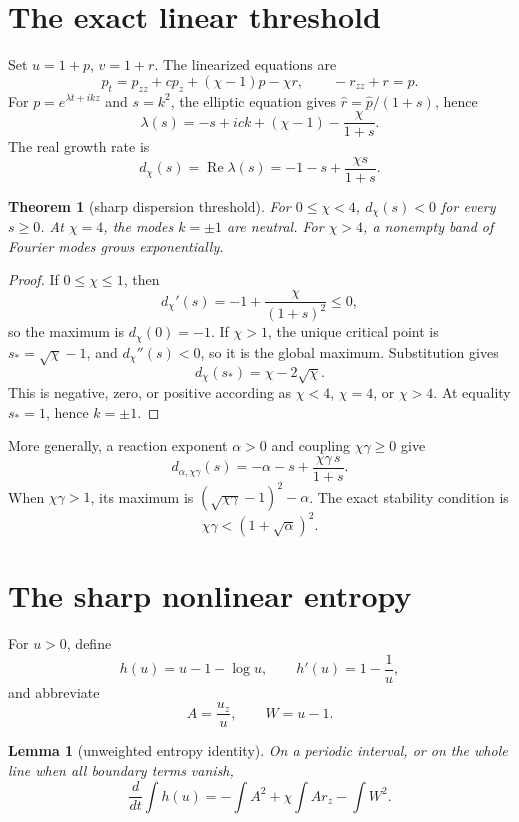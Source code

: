 \documentclass[11pt]{article}
\newtheorem{theorem}{Theorem}
\newtheorem{lemma}{Lemma}
\begin{document}
\section{The exact linear threshold}

Set \(u=1+p\), \(v=1+r\).  The linearized equations are
\[
 p_t=p_{zz}+cp_z+(\chi-1)p-\chi r,
 \qquad -r_{zz}+r=p.
\]
For \(p=e^{\lambda t+ikz}\) and \(s=k^2\), the elliptic equation gives
\(\widehat r=\widehat p/(1+s)\), hence
\begin{equation}
 \lambda(s)=-s+ick+(\chi-1)-\frac{\chi}{1+s}.           \label{eq:lambda}
\end{equation}
The real growth rate is
\begin{equation}
 d_\chi(s)=\operatorname{Re}\lambda(s)
 =-1-s+\frac{\chi s}{1+s}.                             \label{eq:disp}
\end{equation}

\begin{theorem}[sharp dispersion threshold]
For \(0\le\chi<4\), \(d_\chi(s)<0\) for every \(s\ge0\).  At \(\chi=4\),
the modes \(k=\pm1\) are neutral.  For \(\chi>4\), a nonempty band of
Fourier modes grows exponentially.
\end{theorem}

\begin{proof}
If \(0\le\chi\le1\), then
\[
 d_\chi'(s)=-1+\frac{\chi}{(1+s)^2}\le0,
\]
so the maximum is \(d_\chi(0)=-1\).  If \(\chi>1\), the unique critical
point is \(s_*=\sqrt\chi-1\), and \(d_\chi''(s)<0\), so it is the global
maximum.  Substitution gives
\[
 d_\chi(s_*)=\chi-2\sqrt\chi.
\]
This is negative, zero, or positive according as \(\chi<4\), \(\chi=4\),
or \(\chi>4\).  At equality \(s_*=1\), hence \(k=\pm1\).
\end{proof}

More generally, a reaction exponent \(\alpha>0\) and coupling
\(\chi\gamma\ge0\) give
\[
 d_{\alpha,\chi\gamma}(s)
 =-\alpha-s+\frac{\chi\gamma\,s}{1+s}.
\]
When \(\chi\gamma>1\), its maximum is
\((\sqrt{\chi\gamma}-1)^2-\alpha\).  The exact stability condition is
\[
 \chi\gamma<(1+\sqrt\alpha)^2.
\]

\section{The sharp nonlinear entropy}

For \(u>0\), define
\[
 h(u)=u-1-\log u,\qquad h'(u)=1-\frac1u,
\]
and abbreviate
\[
 A=\frac{u_z}{u},\qquad W=u-1.
\]

\begin{lemma}[unweighted entropy identity]
On a periodic interval, or on the whole line when all boundary terms vanish,
\begin{equation}
 \frac{d}{dt}\int h(u)
 =-\int A^2+\chi\int A r_z-\int W^2.                   \label{eq:raw}
\end{equation}
\end{lemma}
\end{document}
